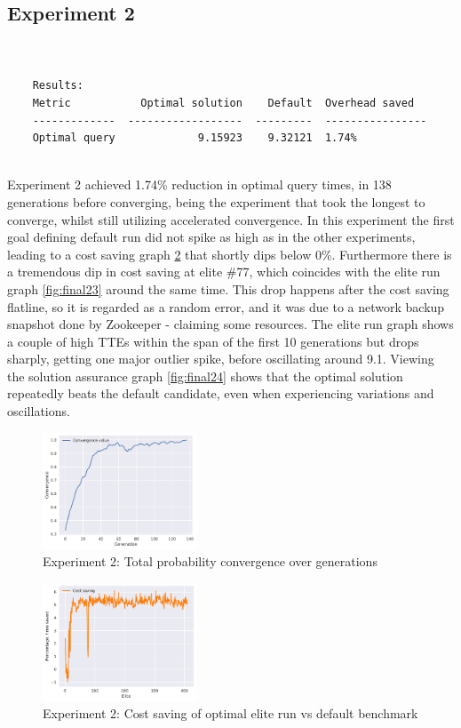 \documentclass[a4paper,english]{report}
\begin{document}
	\subsection{Experiment 2}
	\begin{verbatim}
	
	
	Results:
	Metric           Optimal solution    Default  Overhead saved
	-------------  ------------------  ---------  ----------------
	Optimal query             9.15923    9.32121  1.74%
	
	\end{verbatim}
	Experiment 2 achieved 1.74\% reduction in optimal query times, in 138 generations before converging, being the experiment that took the longest to converge, whilst still utilizing accelerated convergence. In this experiment the first goal defining default run did not spike as high as in the other experiments, leading to a cost saving graph \ref{fig:final22} that shortly dips below 0\%. Furthermore there is a tremendous dip in cost saving at elite \#77, which coincides with the elite run graph \ref{fig:final23} around the same time. This drop happens after the cost saving flatline, so it is regarded as a random error, and it was due to a network backup snapshot done by Zookeeper - claiming some resources. The elite run graph shows a couple of high TTEs within the span of the first 10 generations but drops sharply, getting one major outlier spike, before oscillating around 9.1. Viewing the solution assurance graph \ref{fig:final24} shows that the optimal solution repeatedly beats the default candidate, even when experiencing variations and oscillations.
	\clearpage
	\begin{figure}[H]
		\centering
		\includegraphics[width=130pt]{runlogs/final2/1}
		\caption{Experiment 2: Total probability convergence over generations}
		\label{fig:final21}
	\end{figure}
	\begin{figure}[H]
		\centering
		\includegraphics[width=130pt]{runlogs/final2/2}
		\caption{Experiment 2: Cost saving of optimal elite run vs default benchmark}
		\label{fig:final22}
	\end{figure}
\end{document}
